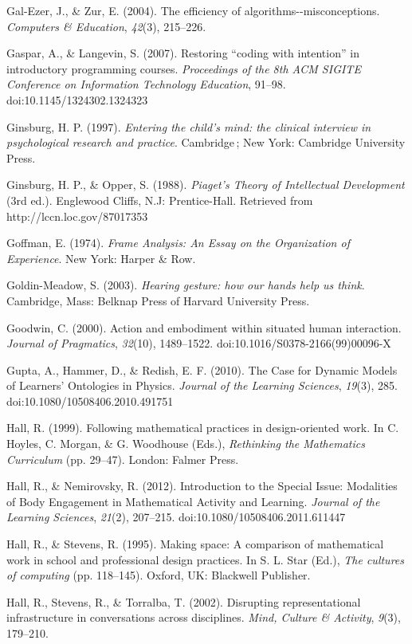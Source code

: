 Gal-Ezer, J., \& Zur, E. (2004). The efficiency of
algorithms-\/-misconceptions. \emph{Computers \& Education},
\emph{42}(3), 215--226.

Gaspar, A., \& Langevin, S. (2007). Restoring ``coding with intention''
in introductory programming courses. \emph{Proceedings of the 8th ACM
SIGITE Conference on Information Technology Education}, 91--98.
doi:10.1145/1324302.1324323

Ginsburg, H. P. (1997). \emph{Entering the child's mind: the clinical
interview in psychological research and practice}. Cambridge ; New York:
Cambridge University Press.

Ginsburg, H. P., \& Opper, S. (1988). \emph{Piaget's Theory of
Intellectual Development} (3rd ed.). Englewood Cliffs, N.J:
Prentice-Hall. Retrieved from http://lccn.loc.gov/87017353

Goffman, E. (1974). \emph{Frame Analysis: An Essay on the Organization
of Experience}. New York: Harper \& Row.

Goldin-Meadow, S. (2003). \emph{Hearing gesture: how our hands help us
think}. Cambridge, Mass: Belknap Press of Harvard University Press.

Goodwin, C. (2000). Action and embodiment within situated human
interaction. \emph{Journal of Pragmatics}, \emph{32}(10), 1489--1522.
doi:10.1016/S0378-2166(99)00096-X

Gupta, A., Hammer, D., \& Redish, E. F. (2010). The Case for Dynamic
Models of Learners' Ontologies in Physics. \emph{Journal of the Learning
Sciences}, \emph{19}(3), 285. doi:10.1080/10508406.2010.491751

Hall, R. (1999). Following mathematical practices in design-oriented
work. In C. Hoyles, C. Morgan, \& G. Woodhouse (Eds.), \emph{Rethinking
the Mathematics Curriculum} (pp. 29--47). London: Falmer Press.

Hall, R., \& Nemirovsky, R. (2012). Introduction to the Special Issue:
Modalities of Body Engagement in Mathematical Activity and Learning.
\emph{Journal of the Learning Sciences}, \emph{21}(2), 207--215.
doi:10.1080/10508406.2011.611447

Hall, R., \& Stevens, R. (1995). Making space: A comparison of
mathematical work in school and professional design practices. In S. L.
Star (Ed.), \emph{The cultures of computing} (pp. 118--145). Oxford, UK:
Blackwell Publisher.

Hall, R., Stevens, R., \& Torralba, T. (2002). Disrupting
representational infrastructure in conversations across disciplines.
\emph{Mind, Culture \& Activity}, \emph{9}(3), 179--210.

